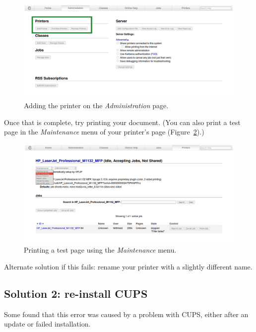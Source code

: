 \documentclass[12pt, a4paper]{article}
\begin{document}
\newpage
\begin{figure}[!hbp]
  \centering
  \includegraphics[width=1\textwidth]{imgs/filter-failed-4.png}
  \caption{Adding the printer on the \emph{Administration} page.}
  \label{fig4}
\end{figure}

\noindent Once that is complete, try printing your document. (You can also print a test page in the \emph{Maintenance} menu of your printer's page (Figure~\ref{fig5}).)

\begin{figure}[!hbp]
  \centering
  \includegraphics[width=1\textwidth]{imgs/filter-failed-5.png}
  \caption{Printing a test page using the \emph{Maintenance} menu.}
  \label{fig5}
\end{figure}

\noindent Alternate solution if this fails: rename your printer with a slightly different name.

\subsection*{Solution 2: re-install CUPS}

Some found that this error was caused by a problem with CUPS, either after an update or failed installation.
\end{document}
